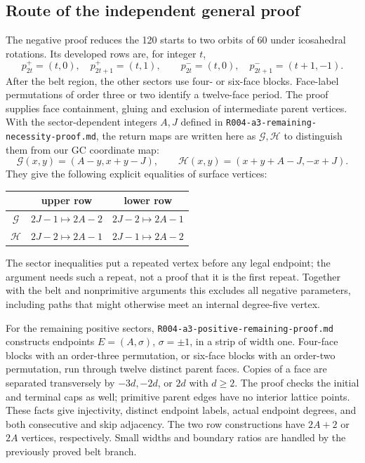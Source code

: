 \documentclass[11pt]{amsart}
\newcommand{\record}[1]{\nolinkurl{#1}}
\begin{document}
\subsection{Route of the independent general proof}
The negative proof reduces the 120 starts to two orbits of 60 under
icosahedral rotations. Its developed rows are, for integer $t$,
\[
 p^+_{2t}=(t,0),\quad p^+_{2t+1}=(t,1),\qquad
 p^-_{2t}=(t,0),\quad p^-_{2t+1}=(t+1,-1).
\]
After the belt region, the other sectors use four- or six-face blocks.
Face-label permutations of order three or two identify a twelve-face
period. The proof supplies face containment, gluing and exclusion of
intermediate parent vertices. With the sector-dependent integers $A,J$
defined in \record{R004-a3-remaining-necessity-proof.md}, the return maps
are written here as $\mathcal G,\mathcal H$ to distinguish them from
our GC coordinate map:
\[
 \mathcal G(x,y)=(A-y,x+y-J),\qquad
 \mathcal H(x,y)=(x+y+A-J,-x+J).
\]
They give the following explicit equalities of surface vertices:
\begin{center}
\begin{tabular}{c|cc}
 & upper row & lower row\\\hline
$\mathcal G$ & $2J-1\mapsto2A-2$ & $2J-2\mapsto2A-1$\\
$\mathcal H$ & $2J-2\mapsto2A-1$ & $2J-1\mapsto2A-2$
\end{tabular}
\end{center}
The sector inequalities put a repeated vertex before any legal endpoint;
the argument needs such a repeat, not a proof that it is the first repeat.
Together with the belt and nonprimitive arguments this excludes all
negative parameters, including paths that might otherwise meet an
internal degree-five vertex.

For the remaining positive sectors,
\record{R004-a3-positive-remaining-proof.md} constructs endpoints
$E=(A,\sigma)$, $\sigma=\pm1$, in a strip of width one. Four-face
blocks with an order-three permutation, or six-face blocks with an
order-two permutation, run through twelve distinct parent faces.
Copies of a face are separated transversely by $-3d,-2d$, or $2d$
with $d\ge2$. The proof checks the initial and terminal caps as well;
primitive parent edges have no interior lattice points. These facts
give injectivity, distinct endpoint labels, actual endpoint degrees,
and both consecutive and skip adjacency. The two row constructions
have $2A+2$ or $2A$ vertices, respectively. Small widths and boundary
ratios are handled by the previously proved belt branch.
\end{document}
